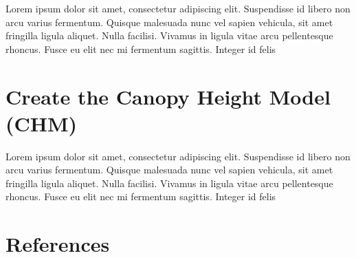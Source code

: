 \documentclass{article}
\begin{document}
Lorem ipsum dolor sit amet, consectetur adipiscing elit. Suspendisse id libero non arcu varius fermentum. Quisque malesuada nunc vel sapien vehicula, sit amet fringilla ligula aliquet. Nulla facilisi. Vivamus in ligula vitae arcu pellentesque rhoncus. Fusce eu elit nec mi fermentum sagittis. Integer id felis
\newpage

\section{Create the Canopy Height Model (CHM)}

Lorem ipsum dolor sit amet, consectetur adipiscing elit. Suspendisse id libero non arcu varius fermentum. Quisque malesuada nunc vel sapien vehicula, sit amet fringilla ligula aliquet. Nulla facilisi. Vivamus in ligula vitae arcu pellentesque rhoncus. Fusce eu elit nec mi fermentum sagittis. Integer id felis
\newpage

\section{References}


\end{document}
